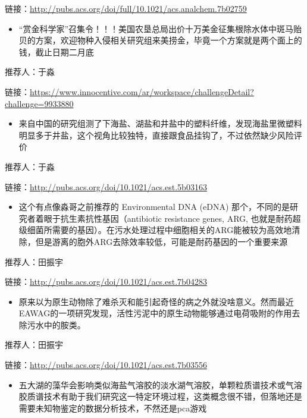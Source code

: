 \documentclass[
]{book}
\providecommand{\tightlist}{%
  \setlength{\itemsep}{0pt}\setlength{\parskip}{0pt}}
\begin{document}
链接：\url{http://pubs.acs.org/doi/full/10.1021/acs.analchem.7b02759}

\begin{itemize}
\tightlist
\item
  ``赏金科学家''召集令！！！美国农垦总局出价十万美金征集根除水体中斑马贻贝的方案，欢迎物种入侵相关研究组来美捞金，毕竟一个方案就是两个面上的钱，截止日期二月底
\end{itemize}

推荐人：于淼

链接：\url{https://www.innocentive.com/ar/workspace/challengeDetail?challenge=9933880}

\begin{itemize}
\tightlist
\item
  来自中国的研究组测了下海盐、湖盐和井盐中的塑料纤维，发现海盐里微塑料明显多于井盐，这个视角比较独特，直接跟食品挂钩了，不过依然缺少风险评价
\end{itemize}

推荐人：于淼

链接：\url{http://pubs.acs.org/doi/10.1021/acs.est.5b03163}

\begin{itemize}
\tightlist
\item
  这个有点像淼哥之前推荐的 Environmental DNA (eDNA) 那个，不同的是研究者着眼于抗生素抗性基因（antibiotic resistance genes, ARG, 也就是耐药超级细菌所需要的基因）。在污水处理过程中细胞相关的ARG能被较为高效地清除，但是游离的胞外ARG去除效率较低，可能是耐药基因的一个重要来源
\end{itemize}

推荐人：田振宇

链接：\url{http://pubs.acs.org/doi/10.1021/acs.est.7b04283}

\begin{itemize}
\tightlist
\item
  原来以为原生动物除了难杀灭和能引起奇怪的病之外就没啥意义。然而最近EAWAG的一项研究发现，活性污泥中的原生动物能够通过电荷吸附的作用去除污水中的胺类。
\end{itemize}

推荐人：田振宇

链接：\url{http://pubs.acs.org/doi/10.1021/acs.est.7b03556}

\begin{itemize}
\tightlist
\item
  五大湖的藻华会影响类似海盐气溶胶的淡水湖气溶胶，单颗粒质谱技术或气溶胶质谱技术有助于我们研究这一特定环境过程，这类概念很不错，但落地还是需要未知物鉴定的数据分析技术，不然还是pca游戏
\end{itemize}
\end{document}
